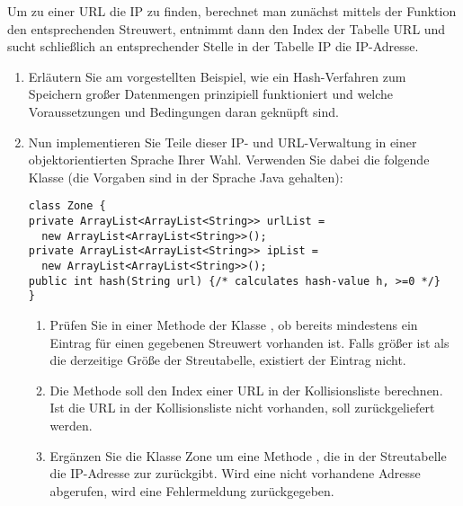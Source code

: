 \documentclass{lehramt-informatik-aufgabe}
\begin{document}
\noindent
Um zu einer URL die IP zu finden, berechnet man zunächst mittels der
Funktion  den entsprechenden Streuwert, entnimmt dann den
Index der Tabelle URL und sucht schließlich an entsprechender Stelle in
der Tabelle IP die IP-Adresse.

\begin{enumerate}


\item Erläutern Sie am vorgestellten Beispiel, wie ein Hash-Verfahren
zum Speichern großer Datenmengen prinzipiell funktioniert und welche
Voraussetzungen und Bedingungen daran geknüpft sind.


\item Nun implementieren Sie Teile dieser IP- und URL-Verwaltung in
einer objektorientierten Sprache Ihrer Wahl. Verwenden Sie dabei die
folgende Klasse (die Vorgaben sind in der Sprache Java gehalten):

\begin{verbatim}
class Zone {
private ArrayList<ArrayList<String>> urlList =
  new ArrayList<ArrayList<String>>();
private ArrayList<ArrayList<String>> ipList =
  new ArrayList<ArrayList<String>>();
public int hash(String url) {/* calculates hash-value h, >=0 */}
}
\end{verbatim}

\begin{enumerate}

\item Prüfen Sie in einer Methode  der
Klasse , ob bereits mindestens ein Eintrag für einen
gegebenen Streuwert vorhanden ist. Falls  größer ist als die
derzeitige Größe der Streutabelle, existiert der Eintrag nicht.

\begin{antwort}
\end{antwort}


\item Die Methode  soll den Index einer URL in der Kollisionsliste berechnen. Ist
die URL in der Kollisionsliste nicht vorhanden, soll 
zurückgeliefert werden.

\begin{antwort}
\end{antwort}


\item Ergänzen Sie die Klasse Zone um eine Methode , die in der Streutabelle die IP-Adresse zur 
zurückgibt. Wird eine nicht vorhandene Adresse abgerufen, wird eine
Fehlermeldung zurückgegeben.

\end{enumerate}
\end{enumerate}
\end{document}
